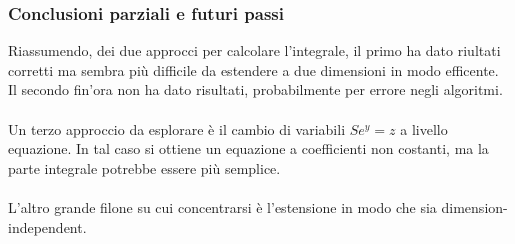 \documentclass[a4paper,10pt]{article}
\begin{document}
\subsubsection{Conclusioni parziali e futuri passi}

Riassumendo, dei due approcci per calcolare l'integrale, il primo ha dato riultati corretti ma sembra più difficile da estendere a due dimensioni in modo efficente. Il secondo fin'ora non ha dato risultati, probabilmente per errore negli algoritmi.\\ \\
Un terzo approccio da esplorare è il cambio di variabili $Se^y=z$ a livello equazione. In tal caso si ottiene un equazione a coefficienti non costanti, ma la parte integrale potrebbe essere più semplice.
\\ \\
L'altro grande filone su cui concentrarsi è l'estensione in modo che sia dimension-independent.
\end{document}
